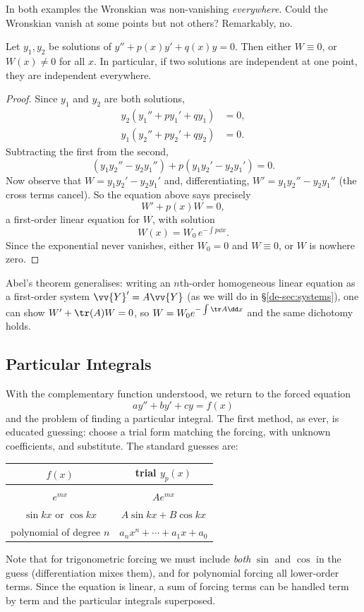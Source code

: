 In both examples the Wronskian was non-vanishing \emph{everywhere}. Could the Wronskian vanish at some points but not others? Remarkably, no.

\begin{theorem}
	Let $y_1, y_2$ be solutions of $y'' + p(x) y' + q(x) y = 0$. Then either $W \equiv 0$, or $W(x) \neq 0$ for all $x$. In particular, if two solutions are independent at one point, they are independent everywhere.
\end{theorem}
\begin{proof}
	Since $y_1$ and $y_2$ are both solutions,
	\begin{align*}
		y_2 (y_1'' + p y_1' + q y_1) &= 0, \\
		y_1 (y_2'' + p y_2' + q y_2) &= 0.
	\end{align*}
	Subtracting the first from the second,
	$$
	(y_1 y_2'' - y_2 y_1'') + p (y_1 y_2' - y_2 y_1') = 0.
	$$
	Now observe that $W = y_1 y_2' - y_2 y_1'$ and, differentiating, $W' = y_1 y_2'' - y_2 y_1''$ (the cross terms cancel). So the equation above says precisely
	$$
	W' + p(x) W = 0,
	$$
	a first-order linear equation for $W$, with solution
	$$
	W(x) = W_0 \, e^{-\int p \dd x}.
	$$
	Since the exponential never vanishes, either $W_0 = 0$ and $W \equiv 0$, or $W$ is nowhere zero.
\end{proof}

\begin{remark}
	Abel's theorem generalises: writing an $n$th-order homogeneous linear equation as a first-order system $\vv{Y}' = A \vv{Y}$ (as we will do in \S\ref{de-sec:systems}), one can show $W' + \tr(A) W = 0$, so $W = W_0 e^{-\int \tr A \dd x}$ and the same dichotomy holds.
\end{remark}

\subsection{Particular Integrals}

With the complementary function understood, we return to the forced equation
$$
a y'' + by' + cy = f(x)
$$
and the problem of finding a particular integral. The first method, as ever, is educated guessing: choose a trial form matching the forcing, with unknown coefficients, and substitute. The standard guesses are:
\begin{center}
	\begin{tabular}{cc}
		$f(x)$ & trial $y_p(x)$ \\[2pt]
		\hline \\[-8pt]
		$e^{mx}$ & $A e^{mx}$ \\
		$\sin kx$ or $\cos kx$ & $A \sin kx + B \cos kx$ \\
		polynomial of degree $n$ & $a_n x^n + \cdots + a_1 x + a_0$
	\end{tabular}
\end{center}
Note that for trigonometric forcing we must include \emph{both} $\sin$ and $\cos$ in the guess (differentiation mixes them), and for polynomial forcing all lower-order terms. Since the equation is linear, a sum of forcing terms can be handled term by term and the particular integrals superposed.

